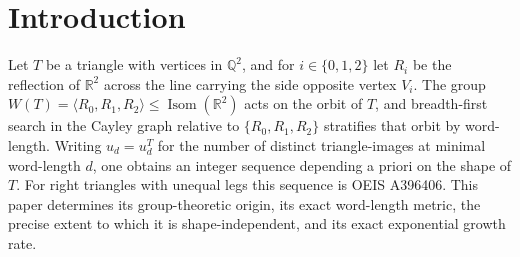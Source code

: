 \documentclass[11pt]{article}
\theoremstyle{plain}
\theoremstyle{definition}
\theoremstyle{remark}
\newcommand{\Q}{\mathbb{Q}}
\newcommand{\R}{\mathbb{R}}
\DeclareMathOperator{\Isom}{Isom}
\begin{document}
\begin{abstract}
relaxed series pins the exact growth rate unconditionally:
$\beta_2 = 1.4916177871\ldots$, the reciprocal square root of the
smallest positive root of an explicit travel-block equation, which
excludes the value $3/2$ suggested by finite-depth ratios. The eight
length-$10$ relations and the universality of $u_d$ through depth $22$
are formally machine-verified in Lean~4; the depth-$32$ threshold and
the deviation witnesses are certified by exact modular and rational
arithmetic. Transcendence of the generating functions over $\Q(x)$, and
of the number $\beta_2$, lies outside the present scope; the appendices
record the finite-horizon structural exclusions on the $43$ known terms,
their Lean certificates, and the conditional routes to transcendence that
were explored.
\end{abstract}

\section{Introduction}
\label{sec:intro}

Let $T$ be a triangle with vertices in $\Q^2$, and for
$i\in\{0,1,2\}$ let $R_i$ be the reflection of $\R^2$ across the line
carrying the side opposite vertex $V_i$. The group
$W(T)=\langle R_0,R_1,R_2\rangle\le\Isom(\R^2)$ acts on the orbit of
$T$, and breadth-first search in the Cayley graph relative to
$\{R_0,R_1,R_2\}$ stratifies that orbit by word-length. Writing
$u_d=u_d^T$ for the number of distinct triangle-images at minimal
word-length $d$, one obtains an integer sequence depending a priori on
the shape of $T$. For right triangles with unequal legs this sequence
is OEIS A396406. This paper determines its group-theoretic origin, its
exact word-length metric, the precise extent to which it is
shape-independent, and its exact exponential growth rate.
\end{document}
